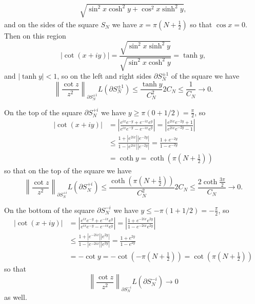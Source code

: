\documentclass{article}
\begin{document}
\begin{Answer}
\begin{enumerate}[(i)]
{\begin{align*}
              {\sqrt{
                 \sin^2 x \cosh^2 y
               + \cos^2 x \sinh^2 y
              }},
      \end{align*}
      and on the sides of the square $S_N$ we have
      $x = \pi\left(N + \frac{1}{2}\right)$ so that $\cos x = 0$. Then
      on this region
      $$
        |\cot (x + i y)|
      = \frac{\sqrt{\sin^2 x \sinh^2 y}}
             {\sqrt{\sin^2 x \cosh^2 y}}
      = \tanh y,
      $$
      and $|\tanh y| < 1$, so on the left and right sides
      $\partial S_N^{\pm 1}$ of the square we have
      $$
           \left\|\frac{\cot z}{z^2}\right\|_{\partial S_N^{\pm 1}}
           L(\partial S_N^{\pm 1})
      \leq \frac{\tanh y}{C_N^2} 2 C_N
      \leq \frac{1}{C_N} \to 0.
      $$

      On the top of the square $\partial S_N^{+i}$
      we have $y \geq \pi(0 + 1/2) = \frac{\pi}{2}$, so
      \begin{align*}
            \left| \cot(x + i y) \right|
      &=    \left|
              \frac{e^{ix} e^{-y} + e^{-ix} e^y}
                   {e^{ix} e^{-y} - e^{-ix} e^y}
            \right|
       =    \left|
              \frac{e^{2ix} e^{-2y} + 1}
                   {e^{2ix} e^{-2y} - 1}
            \right| \\
      &\leq \frac{1 + |e^{2ix}||e^{-2y}|}
                 {1 - |e^{2ix}||e^{-2y}|}
       =    \frac{1 + e^{-2y}}
                 {1 - e^{-2y}} \\
      &=    \coth y
       =    \coth \left(\pi\left(N + \frac{1}{2}\right)\right)
      \end{align*}
      so that on the top of the square we have
      $$
           \left\|
             \frac{\cot z}{z^2}
           \right\|_{\partial S_N^{+i}}
           L(\partial S_N^{+i})
      \leq \frac{\coth \left(\pi\left(N + \frac{1}{2}\right)\right)}
                {C_N^2}
           2C_N
      \leq \frac{2 \coth \frac{3 \pi}{2}}
                {C_N} \to 0.
      $$

      On the bottom of the square $\partial S_N^{-i}$ we have
      $y \leq -\pi(1 + 1/2) = -\frac{\pi}{2}$, so
      \begin{align*}
            \left| \cot(x + i y) \right|
      &=    \left|
              \frac{e^{ix} e^{-y} + e^{-ix} e^y}
                   {e^{ix} e^{-y} - e^{-ix} e^y}
            \right|
       =    \left|
              \frac{1 + e^{-2ix} e^{2y}}
                   {1 - e^{-2ix} e^{2y}}
            \right| \\
      &\leq \frac{1 + |e^{-2ix}||e^{2y}|}
                 {1 - |e^{-2ix}||e^{2y}|}
       =    \frac{1 + e^{2y}}
                 {1 - e^{2y}} \\
      &= -\cot y
       = -\cot \left( -\pi \left(N + \frac{1}{2}\right) \right)
       = \cot \left( \pi \left(N + \frac{1}{2}\right) \right)
      \end{align*}
      so that
      $$
           \left\|
             \frac{\cot z}{z^2}
           \right\|_{\partial S_N^{-i}}
           L(\partial S_N^{-i})
      \to  0
      $$
      as well.

}
\end{enumerate}
\end{Answer}
\end{document}
